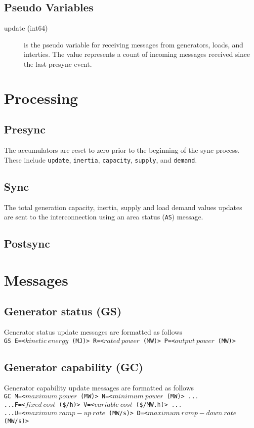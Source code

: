 \subsection{Pseudo Variables}

\begin{description}
\item[update (int64)] is the pseudo variable for receiving messages from generators, loads, and interties. The value represents a count of incoming messages received since the last presync event.
\end{description}

\section{Processing}

\subsection{Presync}

The accumulators are reset to zero prior to the beginning of the sync process.  These include \texttt{update}, \texttt{inertia}, \texttt{capacity}, \texttt{supply}, and \texttt{demand}.

\subsection{Sync}

The total generation capacity, inertia, supply and load demand values updates are sent to the interconnection using an area status (\texttt{AS}) message.

\subsection{Postsync}


\section{Messages}

\subsection{Generator status (GS)}
Generator status update messages are formatted as follows \\
\texttt{GS E=<$kinetic\ energy$ (MJ)> R=<$rated\ power$ (MW)> P=<$output\ power$ (MW)>}

\subsection{Generator capability (GC)}
Generator capability  update messages are formatted as follows \\
\texttt{GC M=<$maximum\ power$ (MW)> N=<$minimum\ power$ (MW)> ...} \\
\texttt{...F=<$fixed\ cost$ (\$/h)> V=<$variable\ cost$ (\$/MW.h)> ...} \\ 
\texttt{...U=<$maximum\ ramp-up\ rate$ (MW/s)> D=<$maximum\ ramp-down\ rate$ (MW/s)>}
